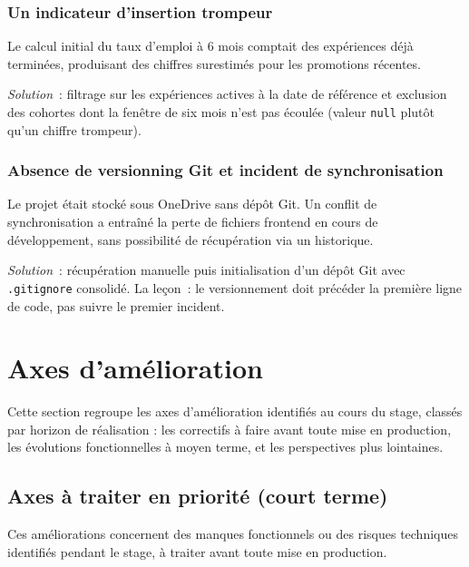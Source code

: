 \documentclass[12pt,a4paper]{report}
\begin{document}
\subsection{Un indicateur d'insertion trompeur}

Le calcul initial du taux d'emploi à 6 mois comptait des expériences déjà terminées, produisant des chiffres surestimés pour les promotions récentes.

\textit{Solution}~: filtrage sur les expériences actives à la date de référence et exclusion des cohortes dont la fenêtre de six mois n'est pas écoulée (valeur \texttt{null} plutôt qu'un chiffre trompeur).

\subsection{Absence de versionning Git et incident de synchronisation}

Le projet était stocké sous OneDrive sans dépôt Git. Un conflit de synchronisation a entraîné la perte de fichiers frontend en cours de développement, sans possibilité de récupération via un historique.

\textit{Solution}~: récupération manuelle puis initialisation d'un dépôt Git avec \texttt{.gitignore} consolidé. La leçon~: le versionnement doit précéder la première ligne de code, pas suivre le premier incident.

\chapter{Axes d'amélioration}

Cette section regroupe les axes d'amélioration identifiés au cours du stage, classés par horizon de réalisation : les correctifs à faire avant toute mise en production, les évolutions fonctionnelles à moyen terme, et les perspectives plus lointaines.

\section{Axes à traiter en priorité (court terme)}

Ces améliorations concernent des manques fonctionnels ou des risques techniques identifiés pendant le stage, à traiter avant toute mise en production.
\end{document}
